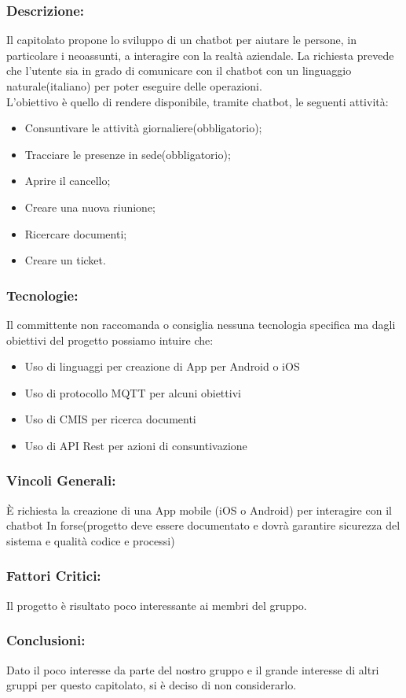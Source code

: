 \subsubsection{Descrizione:}
Il capitolato propone lo sviluppo di un chatbot per aiutare le persone, in particolare i neoassunti, a interagire con la realtà aziendale.
La richiesta prevede che l’utente sia in grado di comunicare con il chatbot con un linguaggio naturale(italiano) per poter eseguire delle operazioni. \\
L’obiettivo è quello di rendere disponibile, tramite chatbot, le seguenti attività:
\begin{itemize}
	\item Consuntivare le attività giornaliere(obbligatorio);
	\item Tracciare le presenze in sede(obbligatorio);
	\item Aprire il cancello;
	\item Creare una nuova riunione;
	\item Ricercare documenti;
	\item Creare un ticket.
	
\end{itemize}

\subsubsection{Tecnologie:}
Il committente non raccomanda o consiglia nessuna tecnologia specifica ma dagli obiettivi del progetto possiamo intuire che:
\begin{itemize}
	\item Uso di linguaggi per creazione di App per Android o iOS
	\item Uso di protocollo MQTT per alcuni obiettivi
	\item Uso di CMIS per ricerca documenti
	\item Uso di API Rest per azioni di consuntivazione  
\end{itemize}

\subsubsection{Vincoli Generali:}
È richiesta la creazione di una App mobile (iOS o Android) per interagire con il chatbot
In forse(progetto deve essere documentato e dovrà garantire sicurezza del sistema e qualità codice e processi)


\subsubsection{Fattori Critici:}
Il progetto è risultato poco interessante ai membri del gruppo.

\subsubsection{Conclusioni:}
Dato il poco interesse da parte del nostro gruppo e il grande interesse di altri gruppi per questo capitolato, si è deciso di non considerarlo.